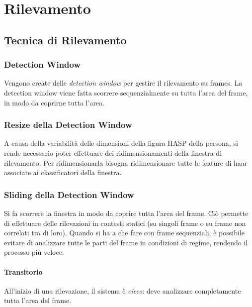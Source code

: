 
\chapter{Rilevamento}
\label{chap:rilevamento}
    \section{Tecnica di Rilevamento}
    \label{sec:detection_tecnique}
        \subsection{Detection Window} %
        \label{sub:detection_window}
            Vengono create delle \emph{detection window} per gestire il rilevamento su frames.
            La detection window viene fatta scorrere sequenzialmente su tutta l'area del frame, in modo da coprirne tutta l'area.
        
        \subsection{Resize della Detection Window} %
        \label{sub:resize_della_detection_window}
            A causa della variabilità delle dimensioni della figura HASP della persona, si rende necessario poter effettuare dei ridimensionamenti della finestra di rilevamento. 
            Per ridimensionarla bisogna ridimensionare tutte le feature di haar associate ai classificatori della finestra.

        \subsection{Sliding della Detection Window} %
        \label{sub:sliding_della_detection_window}
            Si fa scorrere la finestra in modo da coprire tutta l'area del frame.
            Ciò permette di effettuare delle rilevazioni in contesti statici (su singoli frame o su frame non correlati tra di loro).
            Quando si ha a che fare con frame sequenziali, è possibile evitare di analizzare tutte le parti del frame in condizioni di regime, rendendo il processo più veloce.

     
            \subsubsection{Transitorio} %
            \label{ssub:transitorio}
                All'inizio di una rilevazione, il sistema è \emph{cieco}: deve analizzare completamente tutta l'area del frame.
            
